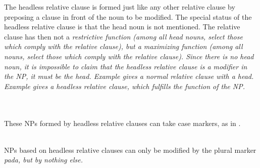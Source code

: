 
The headless relative clause is formed just like any other relative clause  by preposing a clause in front of the noun to be modified. The special status of the headless relative clause is that the head noun is not mentioned. The relative clause has then not a \em restrictive \em function (among all head nouns, select those which comply with the relative clause), but a \em maximizing \em function (among \em all \em nouns, select those which comply with the relative clause). Since there is no head noun, it is impossible to claim that the headless relative clause is a modifier in the NP, it must be the head. Example  gives a normal relative clause with a head. Example  gives a headless relative clause, which fulfills the function of the NP.

\\

\\

These NPs formed by headless relative clauses can take case markers, as in .

\\

NPs based on headless relative clauses can only be modified by the plural marker \em pada\em {}, but by nothing else.


\\

